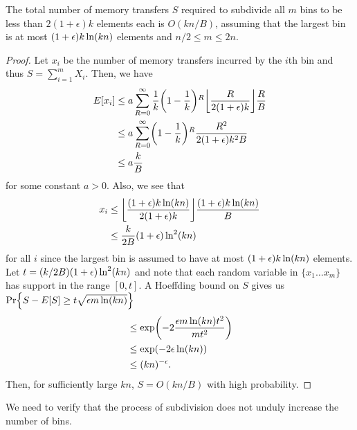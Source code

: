 \begin{theorem}
  The total number of memory transfers $S$ required to subdivide all $m$ bins to be less
  than $2(1+\epsilon)k$ elements each is $O(kn/B)$, assuming that the largest bin is at most 
  $(1+\epsilon)k\ln \mathopen{}\left(kn\right)\mathclose{}$ elements and $n/2 \leq m \leq 2n$.
\end{theorem}
\begin{proof}
  Let $x_i$ be the number of memory transfers incurred by the $i$th bin and
  thus $S=\sum_{i=1}^{m}X_i$.  Then, we have 
  \begin{align*}
    E[x_i] & \leq a \sum_{R=0}^{\infty} \frac{1}{k}\mathopen{}\left(1-\frac{1}{k}\right)\mathclose{}^R \mathopen{}\left\lfloor \frac{R}{2(1+\epsilon)k} \right\rfloor\mathclose{} \frac{R}{B}\\
    & \leq a \sum_{R=0}^{\infty} \mathopen{}\left(1-\frac{1}{k}\right)\mathclose{}^R \frac{R^2}{2(1+\epsilon)k^2B}\\
    & \leq a\frac{k}{B}\\
  \end{align*}
  for some constant $a>0$.
  Also, we see that
  \begin{align*}
    x_i &\leq \mathopen{}\left\lfloor \frac{(1+\epsilon)k\ln \mathopen{}\left(kn\right)\mathclose{}}{2(1+\epsilon)k} \right\rfloor\mathclose{}\frac{(1+\epsilon)k\ln \mathopen{}\left(kn\right)\mathclose{}}{B}\\
    &\leq \frac{k}{2B}(1+\epsilon) \ln ^2 \mathopen{}\left(kn\right)\mathclose{} \\
  \end{align*}
  for all $i$ since the largest bin is assumed to have at most 
  $(1+\epsilon)k\ln \mathopen{}\left(kn\right)\mathclose{}$ elements.  
  Let $t = \mathopen{}\left(k/2B\right)\mathclose{}(1+\epsilon) \ln ^2 \mathopen{}\left(kn\right)\mathclose{}$ and note that 
  each random variable in $\{ x_1 \ldots x_m \}$ has support
  in the range $[0, t]$.
  A Hoeffding bound on $S$ gives us $\Pr\mathopen{}\left\{ S - E[S] \geq t \sqrt{\epsilon m \ln \mathopen{}\left(kn\right)\mathclose{}} \right\}\mathclose{}$
  \begin{align*}
    & \leq \exp \mathopen{}\left(-2\frac{\epsilon m \ln \mathopen{}\left(kn\right)\mathclose{} t^2}{mt^2}\right)\mathclose{}\\
    & \leq \exp \mathopen{}\left(-2\epsilon \ln \mathopen{}\left(kn\right)\mathclose{}\right)\mathclose{}\\
    & \leq \mathopen{}\left(kn\right)\mathclose{}^{-\epsilon}.\\
  \end{align*}
  Then, for sufficiently large $kn$, $S = O(kn/B)$ with high probability.
\end{proof}

We need to verify that the process of subdivision does not unduly increase the number
of bins.

